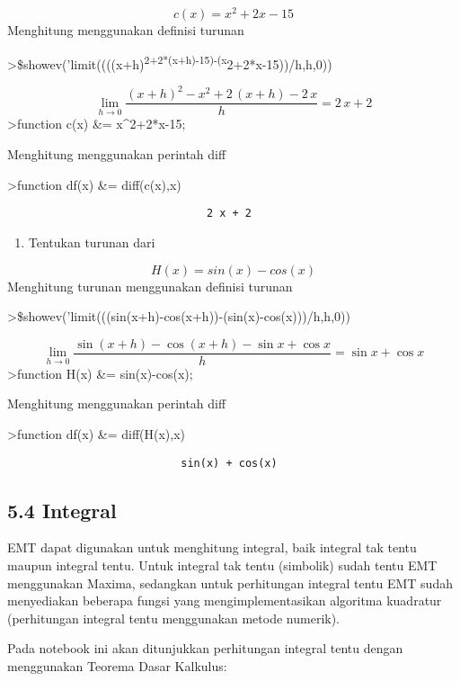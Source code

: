\documentclass[
]{book}
\providecommand{\tightlist}{%
  \setlength{\itemsep}{0pt}\setlength{\parskip}{0pt}}
\begin{document}
\[c(x) = x^2+2x-15\]Menghitung menggunakan definisi turunan

\textgreater\$showev('limit((((x+h)\textsuperscript{2+2*(x+h)-15)-(x}2+2*x-15))/h,h,0))

\[\lim_{h\rightarrow 0}{\frac{\left(x+h\right)^2-x^2+2\,\left(x+h  \right)-2\,x}{h}}=2\,x+2\]\textgreater function c(x) \&= x\^{}2+2*x-15;

Menghitung menggunakan perintah diff

\textgreater function df(x) \&= diff(c(x),x)

\begin{verbatim}
                               2 x + 2
\end{verbatim}

\begin{enumerate}
\def\labelenumi{\arabic{enumi}.}
\setcounter{enumi}{4}
\tightlist
\item
  Tentukan turunan dari
\end{enumerate}

\[H(x)=sin(x)-cos(x)\]Menghitung turunan menggunakan definisi turunan

\textgreater\$showev('limit(((sin(x+h)-cos(x+h))-(sin(x)-cos(x)))/h,h,0))

\[\lim_{h\rightarrow 0}{\frac{\sin \left(x+h\right)-\cos \left(x+h  \right)-\sin x+\cos x}{h}}=\sin x+\cos x\]\textgreater function H(x) \&= sin(x)-cos(x);

Menghitung menggunakan perintah diff

\textgreater function df(x) \&= diff(H(x),x)

\begin{verbatim}
                           sin(x) + cos(x)
\end{verbatim}

\subsection{5.4 Integral}\label{integral}

EMT dapat digunakan untuk menghitung integral, baik integral tak tentu maupun integral tentu. Untuk integral tak tentu (simbolik) sudah tentu EMT menggunakan Maxima, sedangkan untuk perhitungan integral tentu EMT sudah menyediakan beberapa fungsi yang mengimplementasikan algoritma kuadratur (perhitungan integral tentu menggunakan metode numerik).

Pada notebook ini akan ditunjukkan perhitungan integral tentu dengan menggunakan Teorema Dasar Kalkulus:
\end{document}
